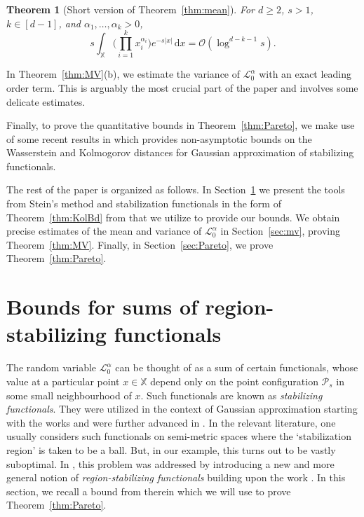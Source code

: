 \documentclass[11pt,reqno]{amsart}
\numberwithin{equation}{section}
\newtheorem{theorem}{Theorem}[section]
\theoremstyle{definition}
\newcommand{\sP}{\mathcal{P}}
\newcommand{\XX}{\mathbb{X}}
\newcommand{\diff}{{\,\mathrm d}}
\begin{document}
\begin{theorem}[Short version of Theorem~\ref{thm:mean}]\label{thm:short} For $d \ge 2$, $s>1$, $k \in [d-1]$, and $\alpha_1, \dots, \alpha_k>0$,
	\begin{equation*}
		s\int_{\XX} \Big(\prod_{i=1}^k x_i^{\alpha_i} \Big) e^{-s |x|} \diff x=\mathcal{O}(\log^{d-k-1} s).
	\end{equation*}
\end{theorem}

In Theorem~\ref{thm:MV}(b), we estimate the variance of $\mathscr{L}_0^{\alpha}$ with an exact leading order term. This is arguably the most crucial part of the paper and involves some delicate estimates. 

Finally, to prove the quantitative bounds in Theorem~\ref{thm:Pareto}, we make use of some recent results in \cite{BM21} which provides non-asymptotic bounds on the Wasserstein and Kolmogorov distances for Gaussian approximation of stabilizing functionals.

The rest of the paper is organized as follows. In Section~\ref{sec:regst} we present the tools from Stein's method and stabilization functionals in the form of Theorem~\ref{thm:KolBd} from \cite{BM21} that we utilize to provide our bounds. We obtain precise estimates of the mean and variance of $\mathscr{L}_0^{\alpha}$ in Section~\ref{sec:mv}, proving Theorem~\ref{thm:MV}. Finally, in Section~\ref{sec:Pareto}, we prove Theorem~\ref{thm:Pareto}.


\section{Bounds for sums of region-stabilizing functionals}\label{sec:regst} The random variable $\mathscr{L}_0^{\alpha}$ can be thought of as a sum of certain functionals, whose value at a particular point $x \in \XX$ depend only on the point configuration $\sP_s$ in some small neighbourhood of $x$. Such functionals are known as \textit{stabilizing functionals}. They were utilized in the context of Gaussian approximation starting with the works \cite{PY01,PY03} and were further advanced in \cite{BX06,PY05,Yu15}. In the relevant literature, one usually considers such functionals on semi-metric spaces where the `stabilization region' is taken to be a ball. But, in our example, this turns out to be vastly suboptimal. In \cite{BM21}, this problem was addressed by introducing a new and more general notion of \textit{region-stabilizing functionals} building upon the work \cite{LSY19}. In this section, we recall a bound from therein which we will use to prove Theorem~\ref{thm:Pareto}.
\end{document}

